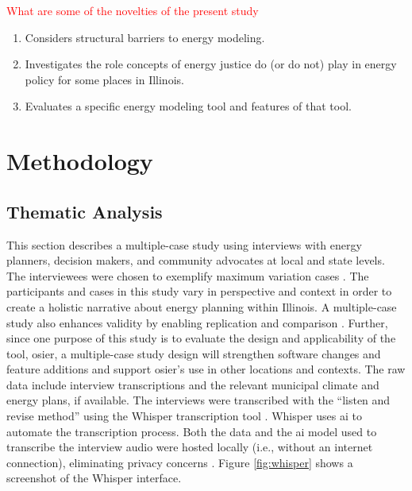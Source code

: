 \textcolor{red}{What are some of the novelties of the present study}
\begin{enumerate}
    \item Considers structural barriers to energy modeling.
    \item Investigates the role concepts of energy justice do (or do not) play
    in energy policy for some places in Illinois.
    \item Evaluates a specific energy modeling tool and features of that tool.
\end{enumerate}
 

\section{Methodology}
\label{section:interview-methods}

\subsection{Thematic Analysis}
This section describes a multiple-case study using interviews with energy
planners, decision makers, and community advocates at local and state levels.
The interviewees were chosen to exemplify maximum variation cases
\cite{flyvbjerg_five_2006}. The participants and cases in this study vary in
perspective and context in order to create a holistic narrative about energy
planning within Illinois. A multiple-case study also enhances validity by
enabling replication and comparison \cite{johannsen_designing_2021,
yin_case_2018}. Further, since one purpose of this study is to evaluate the
design and applicability of the tool, \ac{osier}, a multiple-case study design
will strengthen software changes and feature additions and support \ac{osier}'s
use in other locations and contexts. The raw data include interview
transcriptions and the relevant municipal climate and energy plans, if
available. The interviews were transcribed with the ``listen and revise method''
using the Whisper transcription tool \cite{battaglia_listen_2024}. Whisper uses
\ac{ai} to automate the transcription process. Both the data and the \ac{ai}
model used to transcribe the interview audio were hosted locally (i.e., without
an internet connection), eliminating privacy concerns
\cite{battaglia_listen_2024}. Figure \ref{fig:whisper} shows a screenshot of the
Whisper interface. 

